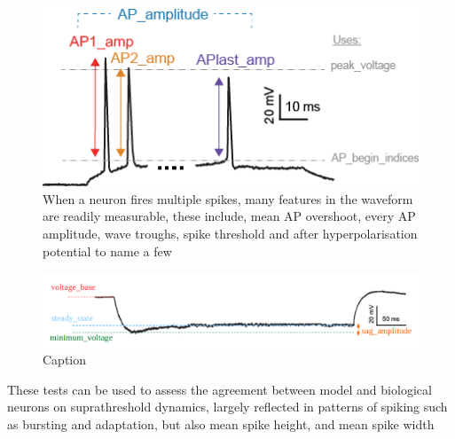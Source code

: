\begin{figure}
    \centering
    \includegraphics{figures/AP_Amplitude.png}
    \caption[]{When a neuron fires multiple spikes, many features in the waveform are readily measurable, these include, mean AP overshoot, every AP amplitude, wave troughs, spike threshold and after hyperpolarisation potential to name a few}
    \label{fig:features_example}
\end{figure}

\begin{figure}
    \centering
    \includegraphics{figures/sag_amplitude}
    \caption{Caption}
    \label{fig:sag_amplitude}
\end{figure}


These tests can be used to assess the agreement between model and biological neurons on suprathreshold dynamics, largely reflected in patterns of spiking such as bursting and adaptation, but also mean spike height, and mean spike width

